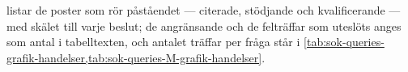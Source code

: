  listar de poster som rör påståendet
--- citerade, stödjande och kvalificerande --- med skälet till varje
beslut; de angränsande och de felträffar som uteslöts anges som antal i
tabelltexten, och antalet träffar per fråga står i
\cref{tab:sok-queries-grafik-handelser,tab:sok-queries-M-grafik-handelser}.
